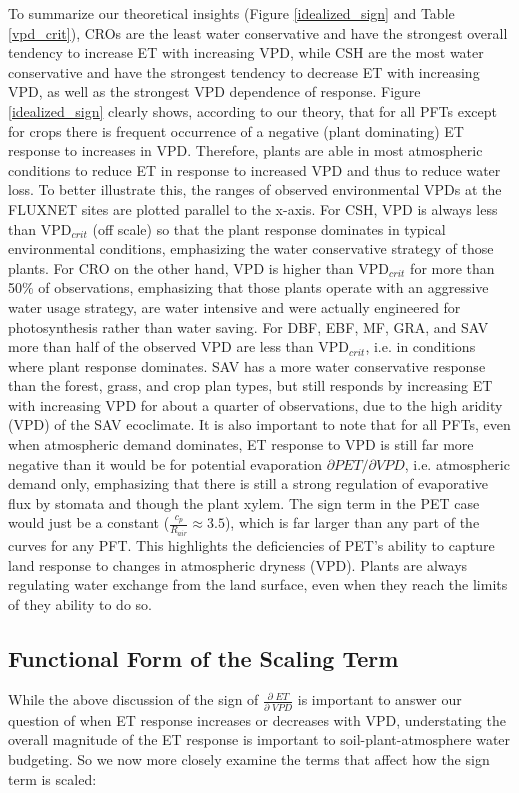 \documentclass[draft,linenumbers]{agujournal}
\begin{document}
To summarize our theoretical insights (Figure \ref{idealized_sign} and
Table \ref{vpd_crit}), CROs are the least water conservative and have
the strongest overall tendency to increase ET with increasing VPD,
while CSH are the most water conservative and have the strongest
tendency to decrease ET with increasing VPD, as well as the strongest
VPD dependence of response. Figure \ref{idealized_sign} clearly shows,
according to our theory, that for all PFTs except for crops there is
frequent occurrence of a negative (plant dominating) ET response to
increases in VPD. Therefore, plants are able in most atmospheric
conditions to reduce ET in response to increased VPD and thus to
reduce water loss. To better illustrate this, the ranges of observed
environmental VPDs at the FLUXNET sites are plotted parallel to the
x-axis. For CSH, VPD is always less than VPD$_{crit}$ (off scale) so
that the plant response dominates in typical environmental conditions,
emphasizing the water conservative strategy of those plants. For CRO
on the other hand, VPD is higher than VPD$_{crit}$ for more than 50\%
of observations, emphasizing that those plants operate with an
aggressive water usage strategy, are water intensive and were actually
engineered for photosynthesis rather than water saving. For DBF, EBF,
MF, GRA, and SAV more than half of the observed VPD are less than
VPD$_{crit}$, i.e. in conditions where plant response dominates. SAV
has a more water conservative response than the forest, grass, and
crop plan types, but still responds by increasing ET with increasing
VPD for about a quarter of observations, due to the high aridity (VPD)
of the SAV ecoclimate. It is also important to note that for all PFTs,
even when atmospheric demand dominates, ET response to VPD is still
far more negative than it would be for potential evaporation
$\partial PET/\partial VPD$, i.e. atmospheric demand only, emphasizing
that there is still a strong regulation of evaporative flux by stomata
and though the plant xylem. The sign term in the PET case would just
be a constant ($\frac{c_p}{R_{air}} \approx 3.5$), which is far larger
than any part of the curves for any PFT. This highlights the
deficiencies of PET's ability to capture land response to changes in
atmospheric dryness (VPD). Plants are always regulating water exchange
from the land surface, even when they reach the limits of they ability
to do so.

\subsection{Functional Form of the Scaling Term}
\label{scale_term}
While the above discussion of the sign of
$\frac{\partial \; ET}{\partial \; VPD}$ is important to answer our
question of when ET response increases or decreases with VPD,
understating the overall magnitude of the ET response is important to
soil-plant-atmosphere water budgeting. So we now more closely examine
the terms that affect how the sign term is scaled:
\end{document}
